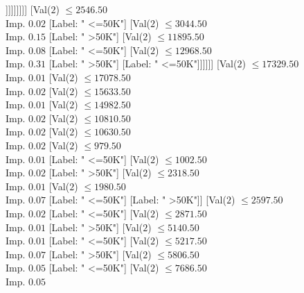 \documentclass[margin=10pt]{standalone}
\begin{document}
\begin{forest}
																	[Label: " <=50K"]
																	[Val($2$) $ \leq 14759.50$ \\ Imp. $1.00$
																		[Label: " >50K"]
																		[Label: " <=50K"]]]]]]]]]
										[Val($2$) $ \leq 2546.50$ \\ Imp. $0.02$
											[Label: " <=50K"]
											[Val($2$) $ \leq 3044.50$ \\ Imp. $0.15$
												[Label: " >50K"]
												[Val($2$) $ \leq 11895.50$ \\ Imp. $0.08$
													[Label: " <=50K"]
													[Val($2$) $ \leq 12968.50$ \\ Imp. $0.31$
														[Label: " >50K"]
														[Label: " <=50K"]]]]]]
									[Val($2$) $ \leq 17329.50$ \\ Imp. $0.01$
										[Val($2$) $ \leq 17078.50$ \\ Imp. $0.02$
											[Val($2$) $ \leq 15633.50$ \\ Imp. $0.01$
												[Val($2$) $ \leq 14982.50$ \\ Imp. $0.02$
													[Val($2$) $ \leq 10810.50$ \\ Imp. $0.02$
														[Val($2$) $ \leq 10630.50$ \\ Imp. $0.02$
															[Val($2$) $ \leq 979.50$ \\ Imp. $0.01$
																[Label: " <=50K"]
																[Val($2$) $ \leq 1002.50$ \\ Imp. $0.02$
																	[Label: " >50K"]
																	[Val($2$) $ \leq 2318.50$ \\ Imp. $0.01$
																		[Val($2$) $ \leq 1980.50$ \\ Imp. $0.07$
																			[Label: " <=50K"]
																			[Label: " >50K"]]
																		[Val($2$) $ \leq 2597.50$ \\ Imp. $0.02$
																			[Label: " <=50K"]
																			[Val($2$) $ \leq 2871.50$ \\ Imp. $0.01$
																				[Label: " >50K"]
																				[Val($2$) $ \leq 5140.50$ \\ Imp. $0.01$
																					[Label: " <=50K"]
																					[Val($2$) $ \leq 5217.50$ \\ Imp. $0.07$
																						[Label: " >50K"]
																						[Val($2$) $ \leq 5806.50$ \\ Imp. $0.05$
																							[Label: " <=50K"]
																							[Val($2$) $ \leq 7686.50$ \\ Imp. $0.05$

\end{forest}
\end{document}
